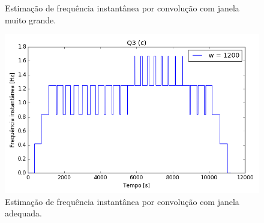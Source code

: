 \documentclass[12pt,letterpaper]{article}
\begin{document}
\begin{enumerate}[label=(\alph*)]
\begin{figure}[H]
            \caption{Estimação de frequência instantânea por convolução com janela muito grande.}
            \label{fig:22}
        \end{figure}
        \begin{figure}[H]
            \centering
            \includegraphics[width=.9\textwidth]{TC1/images/Q3c.png}
            \caption{Estimação de frequência instantânea por convolução com janela adequada.}
            \label{fig:23}
        \end{figure}
\end{enumerate}
\end{document}
